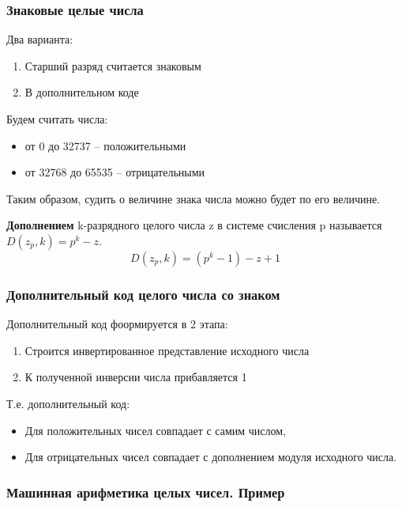 \subsubsection{Знаковые целые числа}

Два варианта:
\begin{enumerate}
  \item Старший разряд считается знаковым
  \item В дополнительном коде
\end{enumerate}

Будем считать числа:
\begin{itemize}
  \item от 0 до 32737 -- положительными 
  \item от 32768 до 65535 -- отрицательными
\end{itemize}

Таким образом, судить о величине знака числа можно будет по его величине.

\begin{definition}
  \textbf{Дополнением} k-разрядного целого числа z в системе счисления p называется $D(z_p, k) = p^{k} - z$. \[
  D(z_p, k) = (p^{k} - 1) - z + 1
  \] 
\end{definition}

\subsubsection*{Дополнительный код целого числа со знаком}

Дополнительный код фоормируется в 2 этапа:
\begin{enumerate}
  \item Строится инвертированное представление исходного числа
  \item К полученной инверсии числа прибавляется 1
\end{enumerate}

Т.е. дополнительный код:
\begin{itemize}
  \item Для положительных чисел совпадает с самим числом,
  \item Для отрицательных чисел совпадает с дополнением модуля исходного числа.
\end{itemize}

\subsubsection*{Машинная арифметика целых чисел. Пример}

